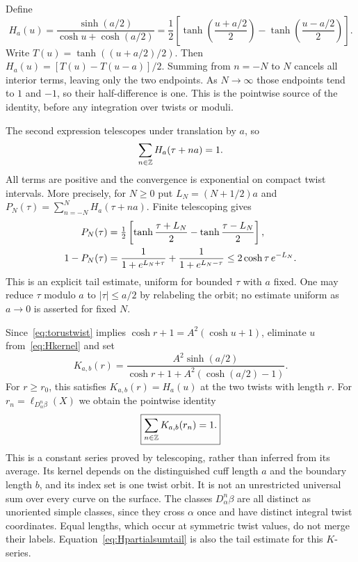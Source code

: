 Define
\begin{equation}
 H_a(u)=\frac{\sinh(a/2)}{\cosh u+\cosh(a/2)}
 =\frac12\left[
 \tanh\left(\frac{u+a/2}{2}\right)
 -\tanh\left(\frac{u-a/2}{2}\right)\right].
 \label{eq:Hkernel}
\end{equation}
Write $T(u)=\tanh((u+a/2)/2)$. Then
$H_a(u)=[T(u)-T(u-a)]/2$. Summing from $n=-N$ to $N$
cancels all interior terms, leaving only the two endpoints.
As $N\to\infty$ those endpoints tend to $1$ and $-1$,
so their half-difference is one. This is the pointwise source
of the identity, before any integration over twists or moduli.

The second expression telescopes under translation by $a$, so
\begin{equation}
 \sum_{n\in\mathbb Z}H_a(\tau+na)=1.
 \label{eq:Hidentity}
\end{equation}
All terms are positive and the convergence is exponential on compact
twist intervals.
More precisely, for $N\geq0$ put $L_N=(N+1/2)a$ and
$P_N(\tau)=\sum_{n=-N}^NH_a(\tau+na)$. Finite telescoping gives
\begin{align}
 P_N(\tau)&=\tfrac12\left[
    \tanh\frac{\tau+L_N}{2}-\tanh\frac{\tau-L_N}{2}\right],\notag\\
 1-P_N(\tau)&=\frac1{1+e^{L_N+\tau}}+
               \frac1{1+e^{L_N-\tau}}
       \leq2\cosh\tau\,e^{-L_N}.
 \label{eq:Hpartialsumtail}
\end{align}
This is an explicit tail estimate, uniform for bounded $\tau$ with $a$
fixed. One may reduce $\tau$ modulo $a$ to $|\tau|\leq a/2$ by relabeling
the orbit; no estimate uniform as $a\to0$ is asserted for fixed $N$.

Since~\eqref{eq:torustwist} implies
$\cosh r+1=A^2(\cosh u+1)$, eliminate $u$ from~\eqref{eq:Hkernel} and set
\begin{equation}
 K_{a,b}(r)=
 \frac{A^2\sinh(a/2)}
      {\cosh r+1+A^2(\cosh(a/2)-1)}.
 \label{eq:Kkernel}
\end{equation}
For $r\geq r_0$, this satisfies $K_{a,b}(r)=H_a(u)$ at the two twists
with length $r$. For $r_n=\ell_{D_\alpha^n\beta}(X)$ we obtain the pointwise identity
\begin{equation}
 \boxed{\sum_{n\in\mathbb Z}K_{a,b}(r_n)=1.}
 \label{eq:Kidentity}
\end{equation}
This is a constant series proved by telescoping, rather than inferred from
its average. Its kernel depends on the distinguished cuff length $a$ and
the boundary length $b$, and its index set is one twist orbit. It is not
an unrestricted universal sum over every curve on the surface.
The classes $D_\alpha^n\beta$ are all distinct as unoriented simple
classes, since they cross $\alpha$ once and have distinct integral twist
coordinates. Equal lengths, which occur at symmetric twist values, do
not merge their labels. Equation~\eqref{eq:Hpartialsumtail} is also the
tail estimate for this $K$-series.

